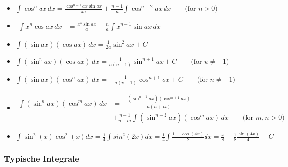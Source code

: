 \documentclass[25pt]{sciposter}
\begin{document}
\begin{multicols}{3}
\begin{itemize}
	\item ${\displaystyle \int \cos ^{n}ax\,dx={\frac {\cos ^{n-1}ax\sin ax}{na}}+{\frac {n-1}{n}}\int \cos ^{n-2}ax\,dx\qquad {\mbox{(for }}n>0{\mbox{)}}}$
	
	\item ${\displaystyle {\begin{aligned}\int x^{n}\cos ax\,dx&={\frac {x^{n}\sin ax}{a}}-{\frac {n}{a}}\int x^{n-1}\sin ax\,dx\end{aligned}}}$
	
	
	
	
	
	\item ${\displaystyle \int (\sin ax)(\cos ax)\,dx={\frac {1}{2a}}\sin ^{2}ax+C}$
	
	\item ${\displaystyle \int (\sin ^{n}ax)(\cos ax)\,dx={\frac {1}{a(n+1)}}\sin ^{n+1}ax+C\qquad {\mbox{(for }}n\neq -1{\mbox{)}}}$
	
	\item ${\displaystyle \int (\sin ax)(\cos ^{n}ax)\,dx=-{\frac {1}{a(n+1)}}\cos ^{n+1}ax+C\qquad {\mbox{(for }}n\neq -1{\mbox{)}}}$
	
	\item $ {\displaystyle {\begin{aligned}\int (\sin ^{n}ax)(\cos ^{m}ax)\,dx&=-{\frac {(\sin ^{n-1}ax)(\cos ^{m+1}ax)}{a(n+m)}}\\&+{\frac {n-1}{n+m}}\int (\sin ^{n-2}ax)(\cos ^{m}ax)\,dx\qquad {\mbox{(for }}m,n>0{\mbox{)}}\end{aligned}}} $
	
	\item $\int \sin^2(x) \cos^2(x) dx = \frac{1}{4}\int sin^2(2x) dx = \frac{1}{4} \int \frac{1-\cos(4x)}{2}dx = \frac{x}{8} - \frac{1}{8} \frac{\sin(4x)}{4} + C$  
	
\end{itemize}



\subsubsection*{Typische Integrale}


\end{multicols}
\end{document}
